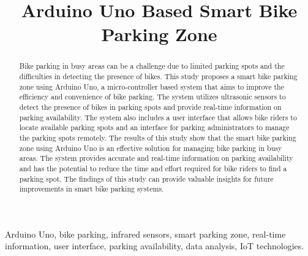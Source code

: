 \documentclass[conference]{IEEEtran}
\begin{document}
	
	\title{Arduino Uno Based Smart Bike Parking Zone\\
		

	}
	
	\author{ 
		\and
	}
	
	\maketitle
	
	\begin{abstract}
		Bike parking in busy areas can be a challenge due to limited parking spots and the difficulties in detecting the presence of bikes. This study proposes a smart bike parking zone using Arduino Uno, a micro-controller based system that aims to improve the efficiency and convenience of bike parking. The system utilizes ultrasonic sensors to detect the presence of bikes in parking spots and provide real-time information on parking availability. The system also includes a user interface that allows bike riders to locate available parking spots and an interface for parking administrators to manage the parking spots remotely. The results of this study show that the smart bike parking zone using Arduino Uno is an effective solution for managing bike parking in busy areas. The system provides accurate and real-time information on parking availability and has the potential to reduce the time and effort required for bike riders to find a parking spot. The findings of this study can provide valuable insights for future improvements in smart bike parking systems.
	\end{abstract}
	
	\begin{IEEEkeywords}
		Arduino Uno, bike parking, infrared sensors, smart parking zone, real-time information, user interface, parking availability, data analysis, IoT technologies.
	\end{IEEEkeywords}
	
\end{document}
